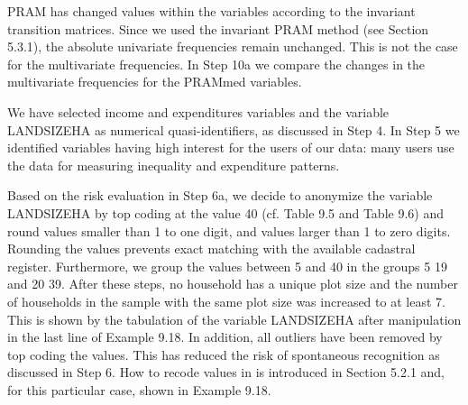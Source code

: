 \documentclass[letterpaper,10pt,english]{sphinxmanual}
\begin{document}
\begin{DUlineblock}{0em}
\item[] 
\item[] \sphinxcode{\sphinxupquote{\#\# - - - - - - - - - - -}}
\item[] 
\item[] 
\item[] 
\item[] 
\item[] 
\item[] 
\item[] 
\item[] 
\item[] 
\end{DUlineblock}

PRAM has changed values within the variables according to the invariant
transition matrices. Since we used the invariant PRAM method (see
Section 5.3.1), the absolute univariate frequencies remain unchanged.
This is not the case for the multivariate frequencies. In Step 10a we
compare the changes in the multivariate frequencies for the PRAMmed
variables.


We have selected income and expenditures variables and the variable
LANDSIZEHA as numerical quasi-identifiers, as discussed in Step 4. In
Step 5 we identified variables having high interest for the users of our
data: many users use the data for measuring inequality and expenditure
patterns.

Based on the risk evaluation in Step 6a, we decide to anonymize the
variable LANDSIZEHA by top coding at the value 40 (cf. Table 9.5 and
Table 9.6) and round values smaller than 1 to one digit, and values
larger than 1 to zero digits. Rounding the values prevents exact
matching with the available cadastral register. Furthermore, we group
the values between 5 and 40 in the groups 5 \textendash{} 19 and 20 \textendash{} 39. After
these steps, no household has a unique plot size and the number of
households in the sample with the same plot size was increased to at
least 7. This is shown by the tabulation of the variable LANDSIZEHA
after manipulation in the last line of Example 9.18. In addition, all
outliers have been removed by top coding the values. This has reduced
the risk of spontaneous recognition as discussed in Step 6. How to
recode values in  is introduced in Section 5.2.1 and, for this
particular case, shown in Example 9.18.
\end{document}
